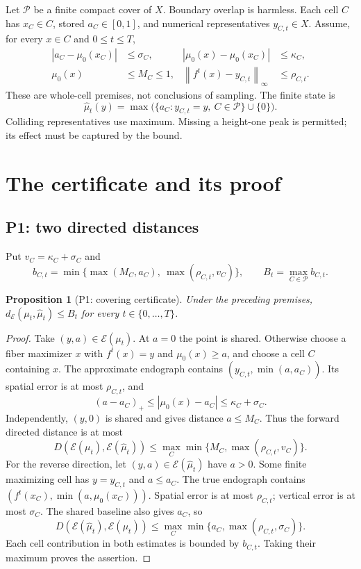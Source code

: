 \documentclass[10pt,a4paper]{article}
\newtheorem{proposition}{Proposition}
\newcommand{\E}{\mathcal{E}}
\newcommand{\dE}{d_{\E}}
\newcommand{\norm}[1]{\left\lVert#1\right\rVert_{\infty}}
\begin{document}
Let $\mathcal P$ be a finite compact cover of $X$. Boundary overlap is harmless.
Each cell $C$ has $x_C\in C$, stored $a_C\in[0,1]$, and numerical representatives
$y_{C,t}\in X$. Assume, for every $x\in C$ and $0\leq t\leq T$,
\begin{align}\label{eq:hypotheses}
 |a_C-\mu_0(x_C)|&\leq\sigma_C,&
 |\mu_0(x)-\mu_0(x_C)|&\leq\kappa_C,\\
 \mu_0(x)&\leq M_C\leq1,&
 \norm{f^t(x)-y_{C,t}}&\leq\rho_{C,t}.
\end{align}
These are whole-cell premises, not conclusions of sampling. The finite state is
\begin{equation}\label{eq:finite}
 \widehat\mu_t(y)=\max\bigl(\{a_C:y_{C,t}=y,\ C\in\mathcal P\}\cup\{0\}\bigr).
\end{equation}
Colliding representatives use maximum. Missing a height-one peak is permitted;
its effect must be captured by the bound.

\section{The certificate and its proof}
\subsection{P1: two directed distances}
Put $v_C=\kappa_C+\sigma_C$ and
\begin{equation}\label{eq:certificate}
 b_{C,t}=\min\{\max(M_C,a_C),\ \max(\rho_{C,t},v_C)\},
 \qquad B_t=\max_{C\in\mathcal P}b_{C,t}.
\end{equation}
\begin{proposition}[P1: covering certificate]
Under the preceding premises, $\dE(\mu_t,\widehat\mu_t)\leq B_t$ for every
$t\in\{0,\ldots,T\}$.
\end{proposition}
\begin{proof}
Take $(y,a)\in\E(\mu_t)$. At $a=0$ the point is shared. Otherwise choose a
fiber maximizer $x$ with $f^t(x)=y$ and $\mu_0(x)\geq a$, and choose a cell
$C$ containing $x$. The approximate endograph contains
$(y_{C,t},\min(a,a_C))$. Its spatial error is at most $\rho_{C,t}$, and
\[
 (a-a_C)_+\leq|\mu_0(x)-a_C|\leq\kappa_C+\sigma_C.
\]
Independently, $(y,0)$ is shared and gives distance $a\leq M_C$. Thus the
forward directed distance is at most
\[
 D(\E(\mu_t),\E(\widehat\mu_t))
 \leq\max_C\min\{M_C,\max(\rho_{C,t},v_C)\}.
\]
For the reverse direction, let $(y,a)\in\E(\widehat\mu_t)$ have $a>0$.
Some finite maximizing cell has $y=y_{C,t}$ and $a\leq a_C$.
The true endograph contains
$(f^t(x_C),\min(a,\mu_0(x_C)))$. Spatial error is at most $\rho_{C,t}$;
vertical error is at most $\sigma_C$. The shared baseline also gives $a_C$,
so
\[
 D(\E(\widehat\mu_t),\E(\mu_t))
 \leq\max_C\min\{a_C,\max(\rho_{C,t},\sigma_C)\}.
\]
Each cell contribution in both estimates is bounded by $b_{C,t}$.
Taking their maximum proves the assertion.
\end{proof}
\end{document}
